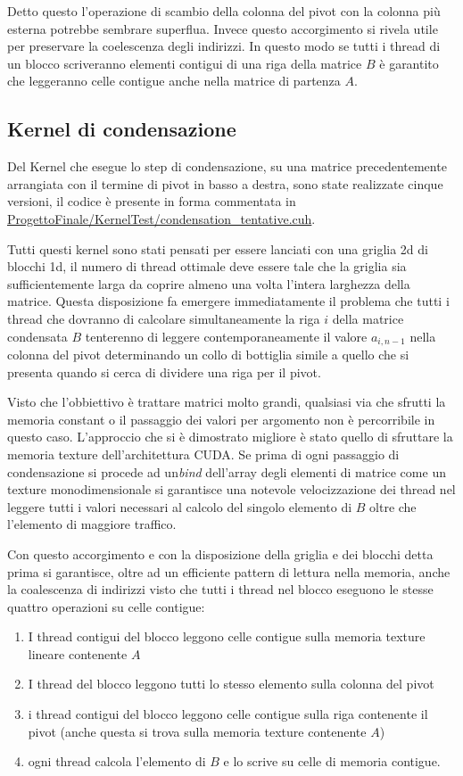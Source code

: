 \documentclass{article}
\begin{document}
Detto questo l'operazione di scambio della colonna del pivot con la colonna più esterna potrebbe sembrare superflua. Invece questo accorgimento si rivela utile per preservare la coelescenza degli indirizzi. In questo modo se tutti i thread di un blocco scriveranno elementi contigui di una riga della matrice $B$ è garantito che leggeranno celle contigue anche nella matrice di partenza $A$.

\subsection{Kernel di condensazione}
Del Kernel che esegue lo step di condensazione, su una matrice precedentemente arrangiata con il termine di pivot in basso a destra, sono state realizzate cinque versioni, il codice è presente in forma commentata in \url{ProgettoFinale/KernelTest/condensation_tentative.cuh}.

Tutti questi kernel sono stati pensati per  essere lanciati con una griglia 2d di blocchi 1d, il numero di thread ottimale deve essere tale che la griglia sia sufficientemente larga da coprire almeno una volta l'intera larghezza della matrice.
Questa disposizione fa emergere immediatamente il problema che tutti i thread che dovranno di calcolare simultaneamente la riga $i$ della matrice condensata $B$ tenterenno di leggere contemporaneamente il valore $a_{i,n-1}$ nella colonna del pivot determinando un collo di bottiglia simile a quello che si presenta quando si cerca di dividere  una riga per il pivot.

Visto che l'obbiettivo è trattare matrici molto grandi, qualsiasi via che sfrutti la memoria constant o il passaggio dei valori per argomento non è percorribile in questo caso.
L'approccio che si è dimostrato migliore è stato quello di sfruttare la memoria texture dell'architettura CUDA. Se prima di ogni passaggio di condensazione si procede ad un\emph{bind} dell'array degli elementi di matrice come un texture monodimensionale si garantisce una notevole velocizzazione dei thread nel leggere tutti i valori necessari al calcolo del singolo elemento di $B$ oltre che l'elemento di maggiore traffico.

Con questo accorgimento e con la disposizione della griglia e dei blocchi detta prima si garantisce, oltre ad un efficiente pattern di lettura nella memoria, anche la coalescenza di indirizzi visto che tutti i thread nel blocco eseguono le stesse quattro operazioni su celle contigue:
\begin{enumerate}
\item I thread contigui del blocco leggono celle contigue sulla memoria texture lineare contenente $A$
\item I thread del blocco leggono tutti lo stesso elemento sulla colonna del pivot
\item i thread contigui del blocco leggono celle contigue sulla riga contenente il pivot (anche questa si trova sulla memoria texture contenente $A$)
\item ogni thread calcola l'elemento di $B$ e lo scrive su celle di memoria contigue.
\end{enumerate}
\end{document}
